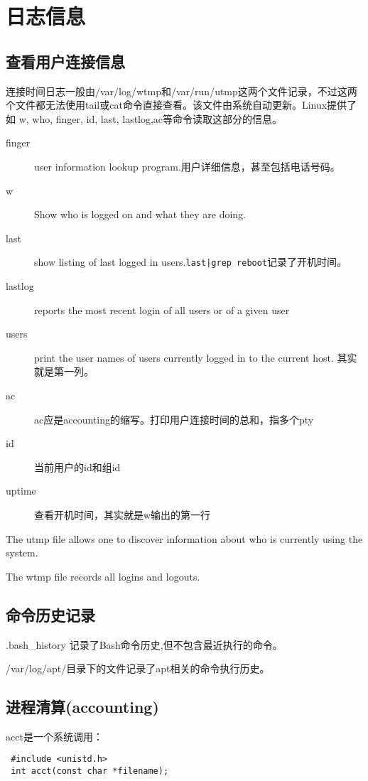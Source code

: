 \section{日志信息}


\subsection{查看用户连接信息}
连接时间日志一般由/var/log/wtmp和/var/run/utmp这两个文件记录，不过这两个文件都无法使用tail或cat命令直接查看。该文件由系统自动更新。Linux提供了如 w, who, finger, id, last, lastlog,ac等命令读取这部分的信息。
\begin{description}
    \item[finger]user information lookup program.用户详细信息，甚至包括电话号码。 
    \item[w]Show who is logged on and what they are doing.
    \item[last]show listing of last logged in users.\verb+last|grep reboot+记录了开机时间。 
    \item[lastlog] reports the most recent login of all users or of a given user
    \item[users]print the user names of users currently logged in to the current host. 其实就是第一列。
    \item[ac]ac应是accounting的缩写。打印用户连接时间的总和，指多个pty
    \item[id]当前用户的id和组id
    \item[uptime]查看开机时间，其实就是w输出的第一行
\end{description}

The utmp file allows one to discover information about who is currently using the system. 

The  wtmp  file records all logins and logouts.

\subsection{命令历史记录}
.bash\_history 记录了Bash命令历史,但不包含最近执行的命令。

/var/log/apt/目录下的文件记录了apt相关的命令执行历史。

\subsection{进程清算(accounting)}

acct是一个系统调用：

\begin{verbatim}
 #include <unistd.h>
 int acct(const char *filename);
\end{verbatim}

